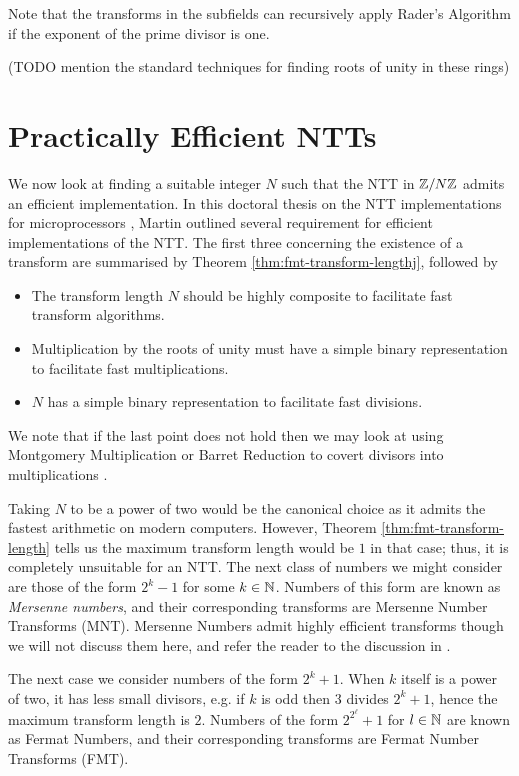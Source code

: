 Note that the transforms in the subfields can recursively apply Rader's Algorithm if the exponent of the prime divisor is one.

(TODO mention the standard techniques for finding roots of unity in these rings)


\section{Practically Efficient NTTs}%
\label{sec:practically-efficient-ntt}

We now look at finding a suitable integer $N$ such that the NTT in ${\mathbb Z} / N{\mathbb Z}$ admits an efficient implementation. In this doctoral thesis on the NTT implementations for microprocessors \cite{ntt-thesis}, Martin outlined several requirement for efficient implementations of the NTT. The first three concerning the existence of a transform are summarised by Theorem \ref{thm:fmt-transform-lengthj}, followed by
\begin{itemize}
    \item The transform length $N$ should be highly composite to facilitate fast transform algorithms.
    \item Multiplication by the roots of unity must have a simple binary representation to facilitate fast multiplications.
    \item $N$ has a simple binary representation to facilitate fast divisions.
\end{itemize}

We note that if the last point does not hold then we may look at using Montgomery Multiplication or Barret Reduction to covert divisors into multiplications \cite{barret}.

Taking $N$ to be a power of two would be the canonical choice as it admits the fastest arithmetic on modern computers. However, Theorem \ref{thm:fmt-transform-length} tells us the maximum transform length would be $1$ in that case; thus, it is completely unsuitable for an NTT. The next class of numbers we might consider are those of the form $2^k - 1$ for some $k \in {\mathbb N}$. Numbers of this form are known as \textit{Mersenne numbers}, and their corresponding transforms are Mersenne Number Transforms (MNT). Mersenne Numbers admit highly efficient transforms though we will not discuss them here, and refer the reader to the discussion in \cite{mersenne} \cite{mersenne-recent}.

The next case we consider numbers of the form $2^k + 1$. When $k$ itself is a power of two, it has less small divisors, e.g. if $k$ is odd then $3$ divides $2^k + 1$, hence the maximum transform length is $2$. Numbers of the form $2^{2^\ell} + 1$ for $l \in {\mathbb N}$ are known as Fermat Numbers, and their corresponding transforms are Fermat Number Transforms (FMT).

